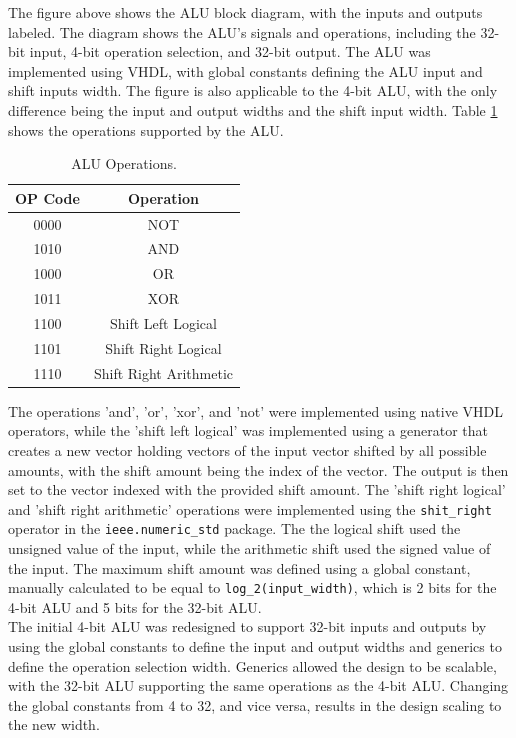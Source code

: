 \documentclass[CMPE]{KGCOEReport}
\begin{document}
The figure above shows the ALU block diagram, with the inputs and outputs labeled. The diagram shows the ALU's signals and operations, including the 32-bit input, 4-bit operation selection, and 32-bit output. The ALU was implemented using VHDL, with global constants defining the ALU input and shift inputs width. The figure is also applicable to the 4-bit ALU, with the only difference being the input and output widths and the shift input width. Table \ref{tab:operations} shows the operations supported by the ALU.

\begin{table}[H]
    \centering
    \begin{tabular}{|c|c|}
        \hline
        \textbf{OP Code} & \textbf{Operation} \\
        \hline
        0000 & NOT \\
        1010 & AND \\
        1000 & OR \\
        1011 & XOR \\
        1100 & Shift Left Logical \\
        1101 & Shift Right Logical \\
        1110 & Shift Right Arithmetic \\
        \hline
    \end{tabular}
    \caption{ALU Operations.}
    \label{tab:operations}
\end{table}

The operations 'and', 'or', 'xor', and 'not' were implemented using native VHDL operators, while the 'shift left logical' was implemented using a generator that creates a new vector holding vectors of the input vector shifted by all possible amounts, with the shift amount being the index of the vector. The output is then set to the vector indexed with the provided shift amount. The 'shift right logical' and 'shift right arithmetic' operations were implemented using the \verb|shit_right| operator in the \verb|ieee.numeric_std| package. The the logical shift used the unsigned value of the input, while the arithmetic shift used the signed value of the input. The maximum shift amount was defined using a global constant, manually calculated to be equal to \verb|log_2(input_width)|, which is 2 bits for the 4-bit ALU and 5 bits for the 32-bit ALU.\\

The initial 4-bit ALU was redesigned to support 32-bit inputs and outputs by using the global constants to define the input and output widths and generics to define the operation selection width. Generics allowed the design to be scalable, with the 32-bit ALU supporting the same operations as the 4-bit ALU. Changing the global constants from 4 to 32, and vice versa, results in the design scaling to the new width.
\end{document}
